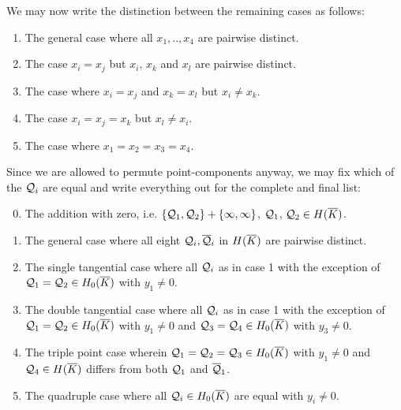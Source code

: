 \documentclass[english,11pt,a4paper]{article}
\begin{document}
We may now write the distinction between the remaining cases as follows:

\begin{enumerate}
	\parskip 1mm
	\item The general case where all $x_1,..,x_4$ are pairwise distinct.
	\item The case $x_i = x_j$ but $x_i$, $x_k$ and $x_l$ are pairwise distinct.
	\item The case where $x_i = x_j$ and $x_k = x_l$ but $x_i \neq x_k$.
	\item The case $x_i = x_j = x_k$ but $x_l \neq x_i$.
	\item The case where $x_1 = x_2 = x_3 = x_4$.
\end{enumerate}
\parskip 3mm

Since we are allowed to permute point-components anyway, we may fix which of the $\mathcal{Q}_i$ are equal and write everything out for the complete and final list:

\vspace{-3mm}
\fline
\begin{enumerate}\setcounter{enumi}{-1}
	\parskip 1mm
	\item The addition with zero, i.e. $\{ \mathcal{Q}_1, \mathcal{Q}_2 \} + \{ \infty, \infty \}$, $\mathcal{Q}_1$, $\mathcal{Q}_2 \in H(\overline K)$.
	\item The general case where all eight $\mathcal{Q}_i, \overline {\mathcal{Q}}_i$ in $H(\overline K)$ are pairwise distinct.
	\item The single tangential case where all $\mathcal{Q}_i$ as in case 1 with the exception of $\mathcal{Q}_1 = \mathcal{Q}_2 \in H_0(\overline K)$ with $y_1 \neq 0$.%
	\item The double tangential case where all $\mathcal{Q}_i$ as in case 1 with the exception of $\mathcal{Q}_1 = \mathcal{Q}_2 \in H_0(\overline K)$ with $y_1 \neq 0$ and $\mathcal{Q}_3 = \mathcal{Q}_4 \in H_0(\overline K)$ with $y_3 \neq 0$.%
	\item The triple point case wherein $\mathcal{Q}_1=\mathcal{Q}_2=\mathcal{Q}_3 \in H_0(\overline K)$ with $y_1 \neq 0$ and $\mathcal{Q}_4 \in H(\overline K)$ differs from both $\mathcal{Q}_1$ and $\overline {\mathcal{Q}}_1$.
	\item The quadruple case where all $\mathcal{Q}_i \in H_0(\overline K)$ are equal with $y_i\neq 0$.
\end{enumerate}
\vspace{-2mm}
\fline
\parskip 3mm
\end{document}
